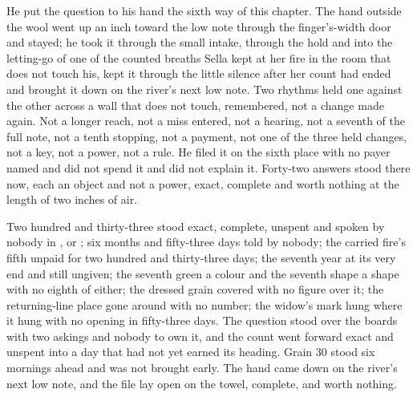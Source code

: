 He put the question to his hand the sixth way of this chapter. The hand outside the wool went up an inch toward the low note through the finger's-width door and stayed; he took it through the small intake, through the hold and into the letting-go of one of the counted breaths Sella kept at her fire in the room that does not touch his, kept it through the little silence after her count had ended and brought it down on the river's next low note. Two rhythms held one against the other across a wall that does not touch, remembered, not a change made again. Not a longer reach, not a miss entered, not a hearing, not a seventh of the full note, not a tenth stopping, not a payment, not one of the three held changes, not a key, not a power, not a rule. He filed it on the sixth place with no payer named and did not spend it and did not explain it. Forty-two answers stood there now, each an object and not a power, exact, complete and worth nothing at the length of two inches of air.

Two hundred and thirty-three stood exact, complete, unspent and spoken by nobody in ,  or ; six months and fifty-three days told by nobody; the carried fire's fifth unpaid for two hundred and thirty-three days; the seventh year at its very end and still ungiven; the seventh green a colour and the seventh shape a shape with no eighth of either; the dressed grain covered with no figure over it; the returning-line place gone around with no number; the widow's mark hung where it hung with no opening in fifty-three days. The question stood over the boards with two askings and nobody to own it, and the count went forward exact and unspent into a day that had not yet earned its heading. Grain 30 stood six mornings ahead and was not brought early. The hand came down on the river's next low note, and the file lay open on the towel, complete, and worth nothing.
